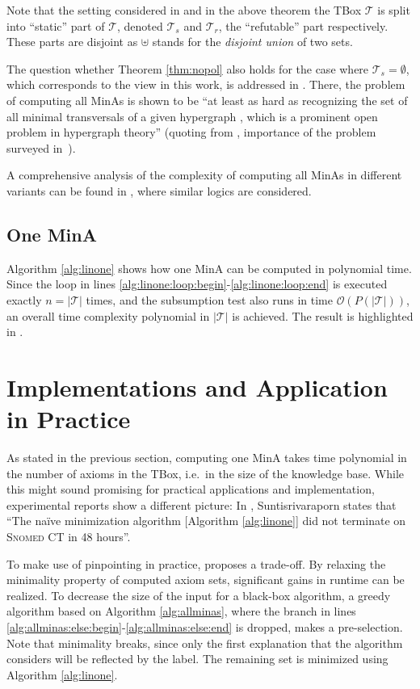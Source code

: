 \documentclass{llncs}
\newcommand{\tb}{\ensuremath{\mathcal{T}}\xspace} %
\newcommand{\snomed}{\textsc{Snomed CT}\xspace}
\begin{document}
Note that the setting considered in \cite{orig1,orig2} and in the above theorem the TBox $\tb$ is split into \enquote{static} part of $\tb$, denoted $\tb_s$ and $\tb_r$, the \enquote{refutable} part respectively. These parts are disjoint as $\uplus$ stands for the \emph{disjoint union} of two sets.

The question whether Theorem \ref{thm:nopol} also holds for the case where $\tb_s = \emptyset$, which corresponds to the view in this work, is addressed in \cite[Thm.~2]{hard}. There, the problem of computing all MinAs is shown to be \enquote{at least as hard as recognizing the set of all minimal transversals of a given hypergraph \cite{hypmintrav}, which is a prominent open problem in hypergraph theory} (quoting from \cite{hard}, importance of the problem surveyed in~\cite{hyperai}).

A comprehensive analysis of the complexity of computing all MinAs in different variants can be found in \cite{family}, where similar logics are considered.

\subsection{One MinA}
\label{sec:one}

Algorithm \ref{alg:linone} shows how one MinA can be computed in polynomial time. Since the loop in lines \ref{alg:linone:loop:begin}-\ref{alg:linone:loop:end} is executed exactly $n = |\tb|$ times, and the subsumption test also runs in time $\mathcal{O}(P(|\tb|))$, an overall time complexity polynomial in $|\tb|$ is achieved. The result is highlighted in \cite[Thm.~6]{orig1,orig2}.

\section{Implementations and Application in Practice}
\label{sec:impl}

As stated in the previous section, computing one MinA takes time polynomial in the number of axioms in the TBox, i.e.~in the size of the knowledge base. While this might sound promising for practical applications and implementation, experimental reports show a different picture: In \cite[Sec.~5.2, p.~97]{meng-phd}, Suntisrivaraporn states that \enquote{The na\"{i}ve minimization algorithm [Algorithm \ref{alg:linone}] did not terminate on \snomed in 48 hours}.

To make use of pinpointing in practice, \cite[Sec.~5]{orig1,orig2} proposes a trade-off. By relaxing the minimality property of computed axiom sets, significant gains in runtime can be realized. To decrease the size of the input for a black-box algorithm, a greedy algorithm based on Algorithm \ref{alg:allminas}, where the branch in lines \ref{alg:allminas:else:begin}-\ref{alg:allminas:else:end} is dropped, makes a pre-selection. Note that minimality breaks, since only the first explanation that the algorithm considers will be reflected by the label. The remaining set is minimized using Algorithm \ref{alg:linone}.
\end{document}
